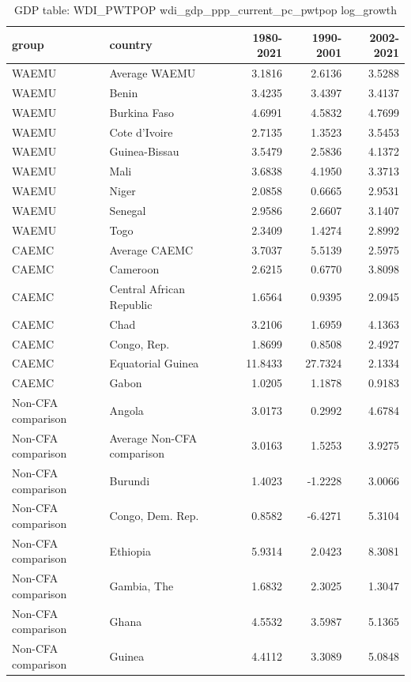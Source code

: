 \begin{table}

\caption{GDP table: WDI_PWTPOP wdi_gdp_ppp_current_pc_pwtpop log_growth}
\centering
\begin{tabular}[t]{llrrr}
\toprule
group & country & 1980-2021 & 1990-2001 & 2002-2021\\
\midrule
WAEMU & Average WAEMU & 3.1816 & 2.6136 & 3.5288\\
WAEMU & Benin & 3.4235 & 3.4397 & 3.4137\\
WAEMU & Burkina Faso & 4.6991 & 4.5832 & 4.7699\\
WAEMU & Cote d'Ivoire & 2.7135 & 1.3523 & 3.5453\\
WAEMU & Guinea-Bissau & 3.5479 & 2.5836 & 4.1372\\
\addlinespace
WAEMU & Mali & 3.6838 & 4.1950 & 3.3713\\
WAEMU & Niger & 2.0858 & 0.6665 & 2.9531\\
WAEMU & Senegal & 2.9586 & 2.6607 & 3.1407\\
WAEMU & Togo & 2.3409 & 1.4274 & 2.8992\\
CAEMC & Average CAEMC & 3.7037 & 5.5139 & 2.5975\\
\addlinespace
CAEMC & Cameroon & 2.6215 & 0.6770 & 3.8098\\
CAEMC & Central African Republic & 1.6564 & 0.9395 & 2.0945\\
CAEMC & Chad & 3.2106 & 1.6959 & 4.1363\\
CAEMC & Congo, Rep. & 1.8699 & 0.8508 & 2.4927\\
CAEMC & Equatorial Guinea & 11.8433 & 27.7324 & 2.1334\\
\addlinespace
CAEMC & Gabon & 1.0205 & 1.1878 & 0.9183\\
Non-CFA comparison & Angola & 3.0173 & 0.2992 & 4.6784\\
Non-CFA comparison & Average Non-CFA comparison & 3.0163 & 1.5253 & 3.9275\\
Non-CFA comparison & Burundi & 1.4023 & -1.2228 & 3.0066\\
Non-CFA comparison & Congo, Dem. Rep. & 0.8582 & -6.4271 & 5.3104\\
\addlinespace
Non-CFA comparison & Ethiopia & 5.9314 & 2.0423 & 8.3081\\
Non-CFA comparison & Gambia, The & 1.6832 & 2.3025 & 1.3047\\
Non-CFA comparison & Ghana & 4.5532 & 3.5987 & 5.1365\\
Non-CFA comparison & Guinea & 4.4112 & 3.3089 & 5.0848\\

\end{tabular}
\end{table}
